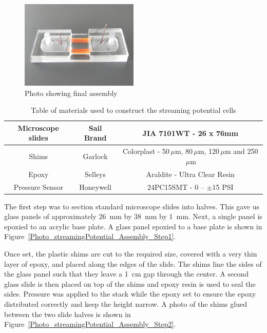     \begin{figure}
      \centering
      \includegraphics[width=0.5\textwidth]{content/pt1/01-PowerHarvesting/graphics/Photo_streamingPotential_Assembly_Step3.JPG}
      \caption{\label{Photo_streamingPotential_Assembly_Step3}Photo showing final assembly}
    \end{figure}

    \begin{table}
      \begin{tabular}{|c|c|c|} \hline Microscope slides & Sail Brand & JIA 7101WT -
          26 x 76mm\tabularnewline \hline Shims & Garlock & Colorplast - 50$\,\mu$m,
          80$\,\mu$m, 120$\,\mu$m and 250$\,\mu$m\tabularnewline \hline Epoxy &
          Selleys & Araldite - Ultra Clear Resin\tabularnewline \hline Pressure
          Sensor & Honeywell & 24PC15SMT - 0 -- $\pm$15 PSI\tabularnewline \hline
      \end{tabular}
      \caption{\label{Table_StreamingCell_MaterialsUsed}Table of materials used to construct the streaming potential cells}
    \end{table}

    The first step was to section standard microscope slides into halves.
    This gave us glass panels of approximately \SI{26}{\milli\meter} by \SI{38}{\milli\meter} by \SI{1}{\milli\meter}.
    Next, a single panel is epoxied to an acrylic base plate.
    A glass panel epoxied to a base plate is shown in Figure~\ref{Photo_streamingPotential_Assembly_Step1}.

    Once set, the plastic shims are cut to the required size, covered with a very thin layer of epoxy, and placed along the edges of the slide.
    The shims line the sides of the glass panel such that they leave a \SI{1}{\centi\meter} gap through the center.
    A second glass slide is then placed on top of the shims and epoxy resin is used to seal the sides.
    Pressure was applied to the stack while the epoxy set to ensure the epoxy distributed correctly and keep the height narrow.
    A photo of the shims glued between the two slide halves is shown in Figure~\ref{Photo_streamingPotential_Assembly_Step2}.

